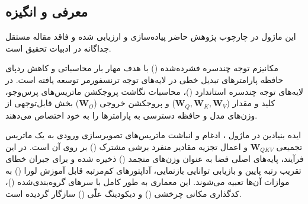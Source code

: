 \subsection{معرفی و انگیزه}
این ماژول در چارچوب پژوهش حاضر پیاده‌سازی و ارزیابی شده و فاقد مقاله مستقل جداگانه در ادبیات تحقیق است.

مکانیزم توجه چندسره فشرده‌شده () با هدف مهار بار محاسباتی و کاهش ردپای حافظه پارامترهای تبدیل خطی در لایه‌های توجه ترنسفورمر توسعه یافته است. در لایه‌های توجه چندسره استاندارد ()، محاسبات نگاشت پروجکشن ماتریس‌های پرس‌وجو، کلید و مقدار ($\mathbf{W}_Q, \mathbf{W}_K, \mathbf{W}_V$) و پروجکشن خروجی ($\mathbf{W}_O$) بخش قابل‌توجهی از وزن‌های مدل و حافظه دسترسی به پارامترها را به خود اختصاص می‌دهند.

ایده بنیادین در ماژول ، ادغام و انباشت ماتریس‌های تصویرسازی ورودی به یک ماتریس تجمیعی $\mathbf{W}_{QKV}$ و اعمال تجزیه مقادیر منفرد برشی مشترک () بر روی آن است. در این فرآیند، پایه‌های اصلی فضا به عنوان وزن‌های منجمد () ذخیره شده و برای جبران خطای تقریب رتبه پایین و بازیابی توانایی بازنمایی، آداپتورهای کم‌مرتبه قابل آموزش لورا () به موازات آن‌ها تعبیه می‌شوند. این معماری به طور کامل با سرهای گروه‌بندی‌شده ()، کدگذاری مکانی چرخشی () و دیکودینگ علّی () سازگار گردیده است.
